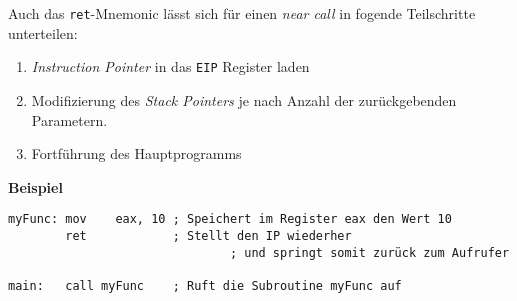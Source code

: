 Auch das \texttt{ret}-Mnemonic lässt sich für einen \textit{near call} in fogende Teilschritte unterteilen:
\begin{enumerate}
	\item \textit{Instruction Pointer} in das \texttt{EIP} Register laden
	\item Modifizierung des \textit{Stack Pointers} je nach Anzahl der zurückgebenden Parametern. 
	\item Fortführung des Hauptprogramms 	
\end{enumerate}

\textbf{Beispiel}
\begin{lstlisting}
myFunc: mov    eax, 10 ; Speichert im Register eax den Wert 10
        ret            ; Stellt den IP wiederher
				               ; und springt somit zurück zum Aufrufer

main:   call myFunc    ; Ruft die Subroutine myFunc auf
\end{lstlisting}
